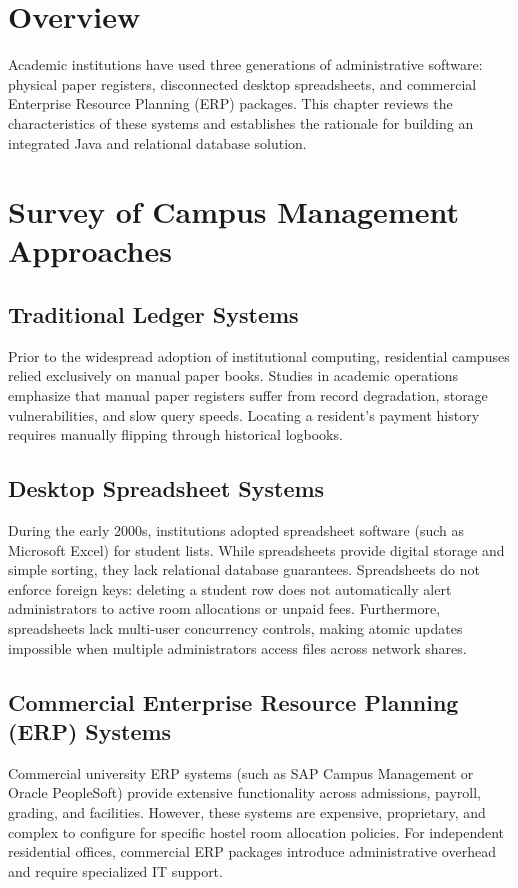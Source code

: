 \documentclass[12pt,a4paper]{report}
\begin{document}
\section{Overview}
Academic institutions have used three generations of administrative software: physical paper registers, disconnected desktop spreadsheets, and commercial Enterprise Resource Planning (ERP) packages. This chapter reviews the characteristics of these systems and establishes the rationale for building an integrated Java and relational database solution.

\section{Survey of Campus Management Approaches}

\subsection{Traditional Ledger Systems}
Prior to the widespread adoption of institutional computing, residential campuses relied exclusively on manual paper books. Studies in academic operations emphasize that manual paper registers suffer from record degradation, storage vulnerabilities, and slow query speeds. Locating a resident's payment history requires manually flipping through historical logbooks.

\subsection{Desktop Spreadsheet Systems}
During the early 2000s, institutions adopted spreadsheet software (such as Microsoft Excel) for student lists. While spreadsheets provide digital storage and simple sorting, they lack relational database guarantees. Spreadsheets do not enforce foreign keys: deleting a student row does not automatically alert administrators to active room allocations or unpaid fees. Furthermore, spreadsheets lack multi-user concurrency controls, making atomic updates impossible when multiple administrators access files across network shares.

\subsection{Commercial Enterprise Resource Planning (ERP) Systems}
Commercial university ERP systems (such as SAP Campus Management or Oracle PeopleSoft) provide extensive functionality across admissions, payroll, grading, and facilities. However, these systems are expensive, proprietary, and complex to configure for specific hostel room allocation policies. For independent residential offices, commercial ERP packages introduce administrative overhead and require specialized IT support.
\end{document}
